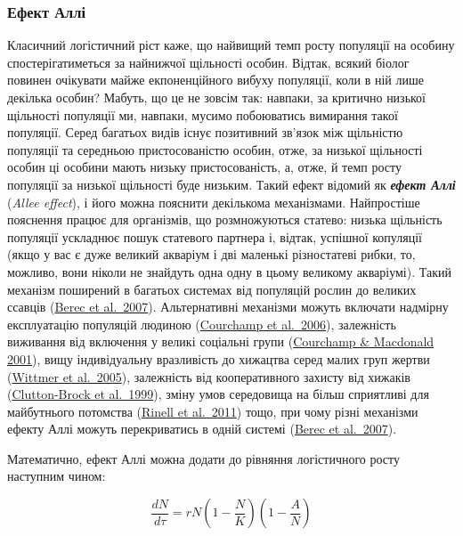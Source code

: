\documentclass[
  11pt,
]{book}
\begin{document}
\subsubsection{Ефект Аллі}\label{ux435ux444ux435ux43aux442-ux430ux43bux43bux456}

Класичний логістичний ріст каже, що найвищий темп росту популяції на особину спостерігатиметься за найнижчої щільності особин. Відтак, всякий біолог повинен очікувати майже екпоненційного вибуху популяції, коли в ній лише декілька особин? Мабуть, що це не зовсім так: навпаки, за критично низької щільності популяції ми, навпаки, мусимо побоюватись вимирання такої популяції. Серед багатьох видів існує позитивний зв'язок між щільністю популяції та середньою пристосованістю особин, отже, за низької щільності особин ці особини мають низьку пристосованість, а, отже, й темп росту популяції за низької щільності буде низьким. Такий ефект відомий як \textbf{\emph{ефект Аллі}} (\emph{Allee effect}), і його можна пояснити декількома механізмами. Найпростіше пояснення працює для організмів, що розмножуються статево: низька щільність популяції ускладнює пошук статевого партнера і, відтак, успішної копуляції (якщо у вас є дуже великий акваріум і дві маленькі різностатеві рибки, то, можливо, вони ніколи не знайдуть одна одну в цьому великому акваріумі). Такий механізм поширений в багатьох системах від популяцій рослин до великих ссавців (\href{https://doi.org/10.1016/j.tree.2006.12.002}{Berec et al.~2007}). Альтернативні механізми можуть включати надмірну експлуатацію популяцій людиною (\href{https://doi.org/10.1371/journal.pbio.0040415}{Courchamp et al.~2006}), залежність виживання від включення у великі соціальні групи (\href{https://doi.org/10.1017/S1367943001001196}{Courchamp \& Macdonald 2001}), вищу індивідуальну вразливість до хижацтва серед малих груп жертви (\href{https://doi.org/10.1007/s00442-005-0055-y}{Wittmer et al.~2005}), залежність від кооперативного захисту від хижаків (\href{https://doi.org/10.1046/j.1365-2656.1999.00317.x}{Clutton-Brock et al.~1999}), зміну умов середовища на більш сприятливі для майбутнього потомства (\href{https://doi.org/10.1139/f2011-133}{Rinell et al.~2011}) тощо, при чому різні механізми ефекту Аллі можуть перекриватись в одній системі (\href{https://doi.org/10.1016/j.tree.2006.12.002}{Berec et al.~2007}).

Математично, ефект Аллі можна додати до рівняння логістичного росту наступним чином:

\[\frac{dN}{d\tau} = rN \left( 1 - \frac{N}{K} \right) \left( 1 - \frac{A}{N}\right)\]
\end{document}

